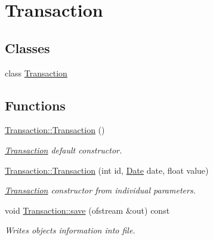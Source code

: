 \hypertarget{group___transaction}{}\section{Transaction}
\label{group___transaction}
\subsection*{Classes}
\begin{DoxyCompactItemize}
\item 
class \hyperlink{class_transaction}{Transaction}
\end{DoxyCompactItemize}
\subsection*{Functions}
\begin{DoxyCompactItemize}
\item 
\mbox{\label{group___transaction_gab47005b855d38bc324bb79fd023baa13}} 
\hyperlink{group___transaction_gab47005b855d38bc324bb79fd023baa13}{Transaction\+::\+Transaction} ()
\begin{DoxyCompactList}\small\item\em \hyperlink{class_transaction}{Transaction} default constructor. \end{DoxyCompactList}\item 
\hyperlink{group___transaction_ga6bba02c02aace16e90745fecd2e4697d}{Transaction\+::\+Transaction} (int id, \hyperlink{class_date}{Date} date, float value)
\begin{DoxyCompactList}\small\item\em \hyperlink{class_transaction}{Transaction} constructor from individual parameters. \end{DoxyCompactList}\item 
void \hyperlink{group___transaction_ga56b1bd622e55266bf795fb01e04e8a21}{Transaction\+::save} (ofstream \&out) const
\begin{DoxyCompactList}\small\item\em Writes object\textquotesingle{}s information into file. \end{DoxyCompactList}\end{DoxyCompactItemize}
